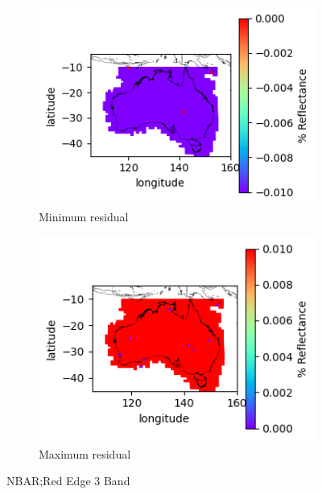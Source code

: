 \documentclass[a4paper]{article}
\begin{document}
      \begin{figure}[h!]
        \centering
          \begin{subfigure}[l]{.4\linewidth}
            \hspace{-32mm}
            \includegraphics[scale=0.9]{plots/nbar/nbar_red_edge_3-MinResidual.png}
            \caption{Minimum residual}
          \end{subfigure}
%
          \begin{subfigure}[r]{.4\linewidth}
            \includegraphics[scale=0.9]{plots/nbar/nbar_red_edge_3-MaxResidual.png}
            \caption{Maximum residual}
          \end{subfigure}
        \caption{NBAR;\@ Red Edge 3 Band}\label{figure:14}
      \end{figure}

  \clearpage
\end{document}
